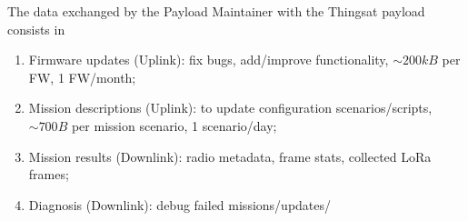 The data exchanged by the Payload Maintainer with the Thingsat payload consists in 
\begin{enumerate}
    \item Firmware updates (Uplink): fix bugs, add/improve functionality, $\sim 200kB$ per FW, 1 FW/month;
    \item Mission descriptions (Uplink): to update configuration scenarios/scripts, $\sim 700B$ per mission scenario, 1 scenario/day;
    \item Mission results (Downlink): radio metadata, frame stats, collected LoRa frames; %
    \item Diagnosis (Downlink): debug failed missions/updates/ %
\end{enumerate} 







